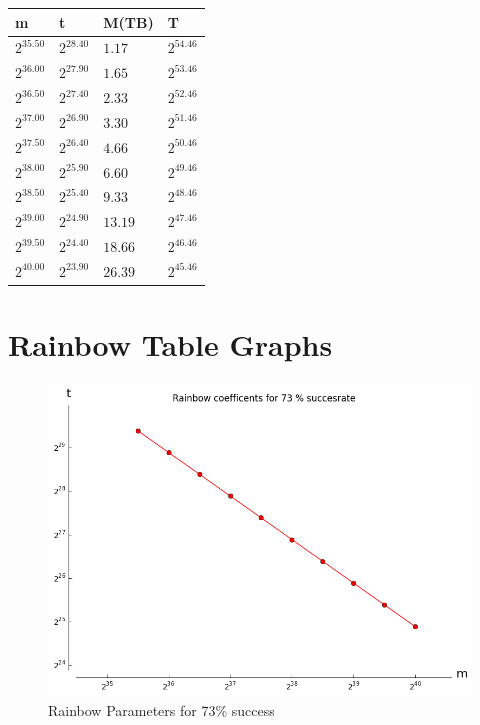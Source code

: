 \begin{table}[h!]\centering
  \begin{tabular}{llll}
    m & t & M(TB) & T \\ \hline
    $2^{35.50}$ & $2^{28.40}$ & $1.17$ & $2^{54.46}$ \\
    $2^{36.00}$ & $2^{27.90}$ & $1.65$ & $2^{53.46}$ \\
    $2^{36.50}$ & $2^{27.40}$ & $2.33$ & $2^{52.46}$ \\
    $2^{37.00}$ & $2^{26.90}$ & $3.30$ & $2^{51.46}$ \\
    $2^{37.50}$ & $2^{26.40}$ & $4.66$ & $2^{50.46}$ \\
    $2^{38.00}$ & $2^{25.90}$ & $6.60$ & $2^{49.46}$ \\
    $2^{38.50}$ & $2^{25.40}$ & $9.33$ & $2^{48.46}$ \\
    $2^{39.00}$ & $2^{24.90}$ & $13.19$ & $2^{47.46}$ \\
    $2^{39.50}$ & $2^{24.40}$ & $18.66$ & $2^{46.46}$ \\
    $2^{40.00}$ & $2^{23.90}$ & $26.39$ & $2^{45.46}$ \\
  \end{tabular}
\end{table}
\section{Rainbow Table Graphs}
\label{sec:rainbowgraphs}
\begin{figure}[H]
  \centering
  \includegraphics[scale=0.5]{figures/RainbowCoef73.png}
  \caption{Rainbow Parameters for 73\% success}
\end{figure}

